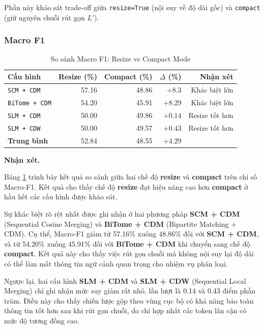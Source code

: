 Phần này khảo sát trade-off giữa \texttt{resize=True} (nội suy về độ
dài gốc) và \texttt{compact} (giữ nguyên chuỗi rút gọn $L'$).

\subsubsection*{Macro F1}

\begin{table}[H]
\centering
\small
\caption{So sánh Macro F1: Resize vs Compact Mode}
\label{tab:compact_vs_resize_micro}
\begin{tabular}{@{}lrrrr@{}}
\toprule
\textbf{Cấu hình} & \textbf{Resize (\%)} & \textbf{Compact (\%)} & \textbf{$\Delta$ (\%)} & \textbf{Nhận xét} \\
\midrule
\texttt{SCM + CDM}  & 57.16 & 48.86 & $+8.3$ & Khác biệt lớn \\
\texttt{BiTome + CDM}   & 54.20 & 45.91 & $+8.29$ & Khác biệt lớn  \\
\texttt{SLM + CDM}   & 50.00 & 49.86 & $+0.14$ & Resize tốt hơn \\
\texttt{SLM + CDW}   & 50.00 & 49.57 & $+0.43$ & Resize tốt hơn \\
\midrule
\textbf{Trung bình}    & 52.84 & 48.55 & $+4.29$ & \\
\bottomrule
\end{tabular}
\end{table}

\textbf{Nhận xét.}

Bảng \ref{tab:compact_vs_resize_micro} trình bày kết quả so sánh giữa
hai chế độ \textbf{resize} và \textbf{compact} trên chỉ số Macro-F1.
Kết quả cho thấy chế độ \textbf{resize} đạt hiệu năng cao hơn
\textbf{compact} ở hầu hết các cấu hình được khảo sát.

Sự khác biệt rõ rệt nhất được ghi nhận ở hai phương pháp
\textbf{SCM + CDM} (Sequential Cosine Merging) và
\textbf{BiTome + CDM} (Bipartite Matching + CDM).
Cụ thể, Macro-F1 giảm từ 57.16\% xuống 48.86\% đối với
\textbf{SCM + CDM}, và từ 54.20\% xuống 45.91\% đối với
\textbf{BiTome + CDM} khi chuyển sang chế độ \textbf{compact}.
Kết quả này cho thấy việc rút gọn chuỗi mà không nội suy lại
độ dài có thể làm mất thông tin ngữ cảnh quan trọng cho nhiệm vụ phân loại.

Ngược lại, hai cấu hình \textbf{SLM + CDM} và \textbf{SLM + CDW}
(Sequential Local Merging) chỉ ghi nhận mức suy giảm rất nhỏ,
lần lượt là 0.14 và 0.43 điểm phần trăm. Điều này cho thấy chiến lược
gộp theo vùng cục bộ có khả năng bảo toàn thông tin tốt hơn sau khi
rút gọn chuỗi, do chỉ hợp nhất các token lân cận có mức độ tương đồng cao.

